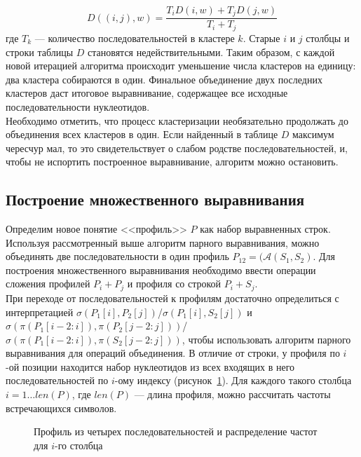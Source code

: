 \begin{equation}\label{eq:upgma}
D((i,j), w)=\frac{T_iD(i,w)+T_jD(j,w)}{T_i+T_j}
\end{equation}
где $T_k$ --- количество последовательностей в кластере $k$. Старые $i$ и $j$ столбцы и строки таблицы $D$ становятся недействительными. Таким образом, с каждой новой итерацией алгоритма происходит уменьшение числа кластеров на единицу: два кластера собираются в один. Финальное объединение двух последних кластеров даст итоговое выравнивание, содержащее все исходные последовательности нуклеотидов. \\
\indent Необходимо отметить, что процесс кластеризации необязательно продолжать до объединения всех кластеров в один. Если найденный в таблице $D$ максимум чересчур мал, то это свидетельствует о слабом родстве последовательностей, и, чтобы не испортить построенное выравнивание, алгоритм можно остановить.

\subsection[Построение множественного выравнивания]{\large Построение множественного выравнивания}
\hspace{\parindent} Определим новое понятие <<профиль>> $P$ как набор выравненных строк. Используя рассмотренный выше алгоритм парного выравнивания, можно объединять две последовательности в один профиль $P_{12}=(\mathcal{A}(S_1, S_2)$. Для построения множественного выравнивания необходимо ввести операции сложения профилей $P_i + P_j$ и профиля со строкой $P_i + S_j$.\\
\indent При переходе от последовательностей к профилям достаточно определиться с интерпретацией $\sigma(P_1[i], P_2[j])$/$\sigma(P_1[i], S_2[j])$ и $\sigma(\pi(P_1[i-2:i]), \pi(P_2[j-2:j]))$/$\sigma(\pi(P_1[i-2:i]), \pi(S_2[j-2:j]))$, чтобы использовать алгоритм парного выравнивания для операций объединения. В отличие от строки, у профиля по $i$-ой позиции находится набор нуклеотидов из всех входящих в него последовательностей по $i$-ому индексу (рисунок~\ref{ris:profile}). Для каждого такого столбца $i=1 \dots len(P)$, где $len(P)$ --- длина профиля, можно рассчитать частоты встречающихся символов.

\begin{figure}[h]
	\caption{Профиль из четырех последовательностей и распределение частот для $i$-го столбца}
	\label{ris:profile}
\end{figure}

